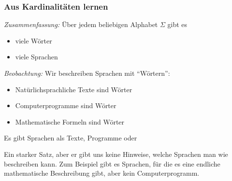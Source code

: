 \documentclass[aspectratio=1610,onlymath]{beamer}
\begin{document}
\begin{frame}\frametitle{Aus Kardinalitäten lernen}

\emph{Zusammenfassung:} Über jedem beliebigen Alphabet $\Sigma$ gibt es
\begin{itemize}
\item {} viele Wörter
\item {} viele Sprachen
\end{itemize}
\bigskip\pause

\emph{Beobachtung:} Wir beschreiben Sprachen mit "`Wörtern"':
\begin{itemize}
\item Natürlichsprachliche Texte sind Wörter
\item Computerprogramme sind Wörter
\item Mathematische Formeln sind Wörter
\end{itemize}
Es gibt  Sprachen als Texte, Programme oder 
\pause
\bigskip


Ein starker Satz, aber er gibt uns keine Hinweise, welche Sprachen man wie beschreiben kann.
Zum Beispiel gibt es Sprachen, für die es eine endliche mathematische Beschreibung gibt, aber kein Computerprogramm.

\end{frame}



\end{document}
